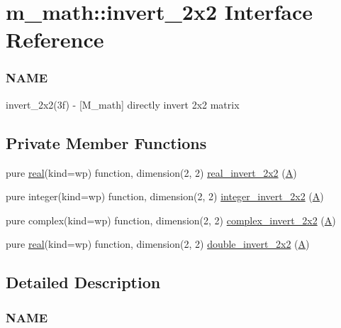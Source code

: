 \hypertarget{interfacem__math_1_1invert__2x2}{}\section{m\+\_\+math\+:\+:invert\+\_\+2x2 Interface Reference}
\label{interfacem__math_1_1invert__2x2}


\subsubsection*{N\+A\+ME}

invert\+\_\+2x2(3f) -\/ \mbox{[}M\+\_\+math\mbox{]} directly invert 2x2 matrix  


\subsection*{Private Member Functions}
\begin{DoxyCompactItemize}
\item 
pure \hyperlink{read__watch_83_8txt_abdb62bde002f38ef75f810d3a905a823}{real}(kind=wp) function, dimension(2, 2) \hyperlink{interfacem__math_1_1invert__2x2_a2c3a267ed54a4db4e9393b03e74618fc}{real\+\_\+invert\+\_\+2x2} (\hyperlink{ufpp__overview_81_8txt_a8341271e5f4e3003f6eb1c9547fc9d1a}{A})
\item 
pure integer(kind=wp) function, dimension(2, 2) \hyperlink{interfacem__math_1_1invert__2x2_ae78383e51ec51bc8d12123e197804c3c}{integer\+\_\+invert\+\_\+2x2} (\hyperlink{ufpp__overview_81_8txt_a8341271e5f4e3003f6eb1c9547fc9d1a}{A})
\item 
pure complex(kind=wp) function, dimension(2, 2) \hyperlink{interfacem__math_1_1invert__2x2_ab4c707576dd541a8fe6252364b4de2aa}{complex\+\_\+invert\+\_\+2x2} (\hyperlink{ufpp__overview_81_8txt_a8341271e5f4e3003f6eb1c9547fc9d1a}{A})
\item 
pure \hyperlink{read__watch_83_8txt_abdb62bde002f38ef75f810d3a905a823}{real}(kind=wp) function, dimension(2, 2) \hyperlink{interfacem__math_1_1invert__2x2_ac3a74a1e772db1ab6d55d7f950d9cd63}{double\+\_\+invert\+\_\+2x2} (\hyperlink{ufpp__overview_81_8txt_a8341271e5f4e3003f6eb1c9547fc9d1a}{A})
\end{DoxyCompactItemize}


\subsection{Detailed Description}
\subsubsection*{N\+A\+ME}

